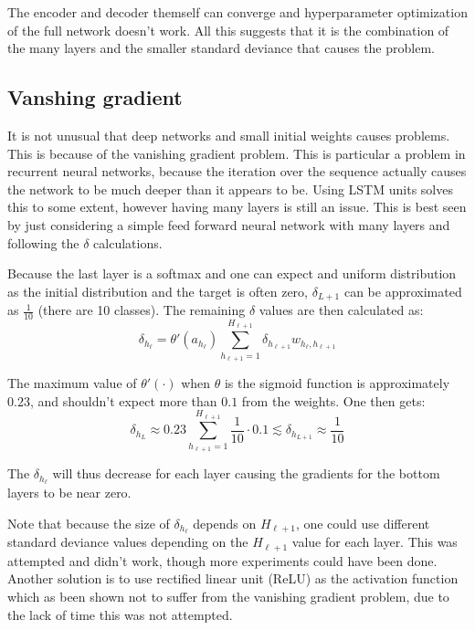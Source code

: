 The encoder and decoder themself can converge and hyperparameter optimization of the full network doesn't work. All this suggests that it is the combination of the many layers and the smaller standard deviance that causes the problem.

\subsection{Vanshing gradient}
It is not unusual that deep networks and small initial weights causes problems. This is because of the vanishing gradient problem. This is particular a problem in recurrent neural networks, because the iteration over the sequence actually causes the network to be much deeper than it appears to be. Using LSTM units solves this to some extent, however having many layers is still an issue. This is best seen by just considering a simple feed forward neural network with many layers and following the $\delta$ calculations.

Because the last layer is a softmax and one can expect and uniform distribution as the initial distribution and the target is often zero, $\delta_{L+1}$ can be approximated as $\frac{1}{10}$ (there are 10 classes). The remaining $\delta$ values are then calculated as:
\begin{equation}
\delta_{h_\ell} = \theta'(a_{h_\ell}) \sum_{h_{\ell+1} = 1}^{H_{\ell+1}} \delta_{h_{\ell+1}} w_{h_\ell, h_{\ell+1}}
\end{equation}

The maximum value of $\theta'(\cdot)$ when $\theta$ is the sigmoid function is approximately $0.23$, and shouldn't expect more than $0.1$ from the weights. One then gets:
\begin{equation}
\delta_{h_L} \approx 0.23 \sum_{h_{\ell+1} = 1}^{H_{\ell+1}} \frac{1}{10} \cdot 0.1 \lesssim \delta_{h_{L+1}} \approx \frac{1}{10}
\end{equation}

The $\delta_{h_\ell}$ will thus decrease for each layer causing the gradients for the bottom layers to be near zero.

Note that because the size of $\delta_{h_\ell}$ depends on $H_{\ell+1}$, one could use different standard deviance values depending on the $H_{\ell+1}$ value for each layer. This was attempted and didn't work, though more experiments could have been done. Another solution is to use rectified linear unit (ReLU) as the activation function which as been shown not to suffer from the vanishing gradient problem, due to the lack of time this was not attempted.

